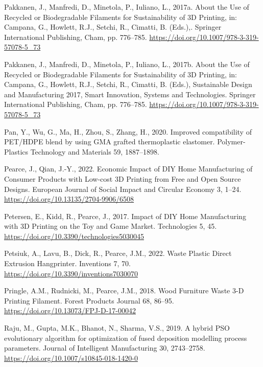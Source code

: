 \documentclass[
  12pt,
]{article}
\newlength{\cslhangindent}
\newlength{\cslentryspacingunit} %
\newenvironment{CSLReferences}[2] %
 {%
  \setlength{\parindent}{0pt}
  \ifodd #1
  \let\oldpar\par
  \def\par{\hangindent=\cslhangindent\oldpar}
  \fi
  \setlength{\parskip}{#2\cslentryspacingunit}
 }%
 {}
\begin{document}
\begin{CSLReferences}{1}{0}
\leavevmode{}%
Pakkanen, J., Manfredi, D., Minetola, P., Iuliano, L., 2017a. About the
{Use} of {Recycled} or {Biodegradable Filaments} for {Sustainability} of
{3D Printing}, in: Campana, G., Howlett, R.J., Setchi, R., Cimatti, B.
(Eds.),. {Springer International Publishing}, {Cham}, pp. 776--785.
\url{https://doi.org/10.1007/978-3-319-57078-5_73}

\leavevmode{}%
Pakkanen, J., Manfredi, D., Minetola, P., Iuliano, L., 2017b. About the
{Use} of {Recycled} or {Biodegradable Filaments} for {Sustainability} of
{3D Printing}, in: Campana, G., Howlett, R.J., Setchi, R., Cimatti, B.
(Eds.), Sustainable {Design} and {Manufacturing} 2017, Smart
{Innovation}, {Systems} and {Technologies}. {Springer International
Publishing}, {Cham}, pp. 776--785.
\url{https://doi.org/10.1007/978-3-319-57078-5_73}

\leavevmode{}%
Pan, Y., Wu, G., Ma, H., Zhou, S., Zhang, H., 2020. Improved
compatibility of PET/HDPE blend by using GMA grafted thermoplastic
elastomer. Polymer-Plastics Technology and Materials 59, 1887--1898.

\leavevmode{}%
Pearce, J., Qian, J.-Y., 2022. Economic {Impact} of {DIY Home
Manufacturing} of {Consumer Products} with {Low-cost 3D Printing} from
{Free} and {Open Source Designs}. European Journal of Social Impact and
Circular Economy 3, 1--24. \url{https://doi.org/10.13135/2704-9906/6508}

\leavevmode{}%
Petersen, E., Kidd, R., Pearce, J., 2017. Impact of {DIY Home
Manufacturing} with {3D Printing} on the {Toy} and {Game Market}.
Technologies 5, 45. \url{https://doi.org/10.3390/technologies5030045}

\leavevmode{}%
Petsiuk, A., Lavu, B., Dick, R., Pearce, J.M., 2022. Waste {Plastic
Direct Extrusion Hangprinter}. Inventions 7, 70.
\url{https://doi.org/10.3390/inventions7030070}

\leavevmode{}%
Pringle, A.M., Rudnicki, M., Pearce, J.M., 2018. Wood {Furniture
Waste} 3-{D Printing Filament}. Forest
Products Journal 68, 86--95.
\url{https://doi.org/10.13073/FPJ-D-17-00042}

\leavevmode{}%
Raju, M., Gupta, M.K., Bhanot, N., Sharma, V.S., 2019. A hybrid
{PSO} evolutionary algorithm for optimization of fused
deposition modelling process parameters. Journal of Intelligent
Manufacturing 30, 2743--2758.
\url{https://doi.org/10.1007/s10845-018-1420-0}


\end{CSLReferences}
\end{document}
